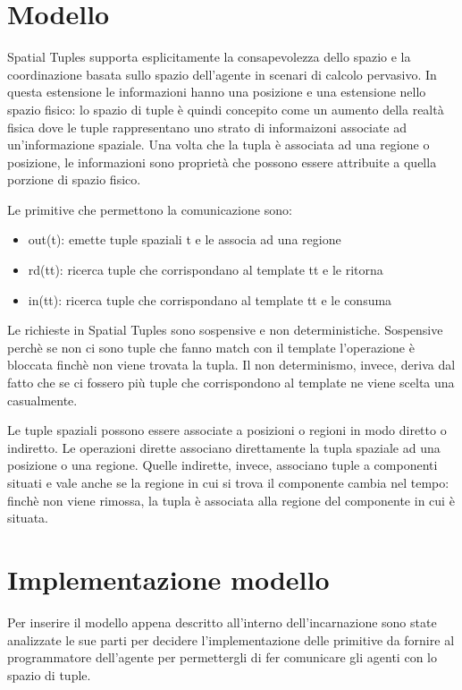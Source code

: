 \documentclass[12pt,a4paper,openright,twoside]{report}
\begin{document}
\section{Modello}\label{ModelloSpatialTuples}

Spatial Tuples supporta esplicitamente la consapevolezza dello spazio e la coordinazione basata sullo spazio dell'agente in scenari di calcolo pervasivo. In questa estensione le informazioni hanno una posizione e una estensione nello spazio fisico: lo spazio di tuple \`e quindi concepito come un aumento della realt\`a fisica dove le tuple rappresentano uno strato di informaizoni associate ad un'informazione spaziale.
Una volta che la tupla \`e associata ad una regione o posizione, le informazioni sono propriet\`a che possono essere attribuite a quella porzione di spazio fisico.

Le primitive che permettono la comunicazione sono:
\begin{itemize}
   \item out(t): emette tuple spaziali t e le associa ad una regione
   \item rd(tt): ricerca tuple che corrispondano al template tt e le ritorna
   \item in(tt): ricerca tuple che corrispondano al template tt e le consuma
\end{itemize}

Le richieste in Spatial Tuples sono sospensive e non deterministiche. Sospensive perch\`e se non ci sono tuple che fanno match con il template l'operazione \`e bloccata finch\`e non viene trovata la tupla. Il non determinismo, invece, deriva dal fatto che se ci fossero pi\`u tuple che corrispondono al template ne viene scelta una casualmente.

Le tuple spaziali possono essere associate a posizioni o regioni in modo diretto o indiretto. Le operazioni dirette associano direttamente la tupla spaziale ad una posizione o una regione. Quelle indirette, invece, associano tuple a componenti situati e vale anche se la regione in cui si trova il componente cambia nel tempo: finch\`e non viene rimossa, la tupla \`e associata alla regione del componente in cui \`e situata.


\section{Implementazione modello}
Per inserire il modello appena descritto all'interno dell'incarnazione sono state analizzate le sue parti per decidere l'implementazione delle primitive da fornire al programmatore dell'agente per permettergli di fer comunicare gli agenti con lo spazio di tuple.
\end{document}
